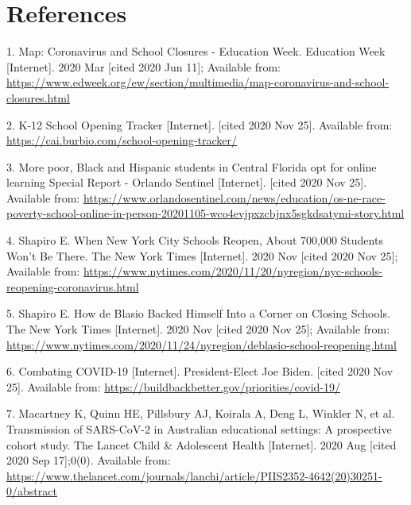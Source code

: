 \documentclass[
]{article}
\begin{document}
\clearpage

\hypertarget{references}{%
\section*{References}\label{references}}

\hypertarget{refs}{}
\leavevmode\hypertarget{ref-noauthor_map_2020}{}%
1. Map: Coronavirus and School Closures - Education Week. Education Week
{[}Internet{]}. 2020 Mar {[}cited 2020 Jun 11{]}; Available from:
\url{https://www.edweek.org/ew/section/multimedia/map-coronavirus-and-school-closures.html}

\leavevmode\hypertarget{ref-noauthor_k-12_nodate}{}%
2. K-12 School Opening Tracker {[}Internet{]}. {[}cited 2020 Nov 25{]}.
Available from: \url{https://cai.burbio.com/school-opening-tracker/}

\leavevmode\hypertarget{ref-noauthor_more_nodate}{}%
3. More poor, Black and Hispanic students in Central Florida opt for
online learning Special Report - Orlando Sentinel {[}Internet{]}.
{[}cited 2020 Nov 25{]}. Available from:
\url{https://www.orlandosentinel.com/news/education/os-ne-race-poverty-school-online-in-person-20201105-wco4evjpxzcbjnx5sgkdsatymi-story.html}

\leavevmode\hypertarget{ref-shapiro_when_2020}{}%
4. Shapiro E. When New York City Schools Reopen, About 700,000 Students
Won't Be There. The New York Times {[}Internet{]}. 2020 Nov {[}cited
2020 Nov 25{]}; Available from:
\url{https://www.nytimes.com/2020/11/20/nyregion/nyc-schools-reopening-coronavirus.html}

\leavevmode\hypertarget{ref-shapiro_how_2020}{}%
5. Shapiro E. How de Blasio Backed Himself Into a Corner on Closing
Schools. The New York Times {[}Internet{]}. 2020 Nov {[}cited 2020 Nov
25{]}; Available from:
\url{https://www.nytimes.com/2020/11/24/nyregion/deblasio-school-reopening.html}

\leavevmode\hypertarget{ref-noauthor_combating_nodate}{}%
6. Combating COVID-19 {[}Internet{]}. President-Elect Joe Biden.
{[}cited 2020 Nov 25{]}. Available from:
\url{https://buildbackbetter.gov/priorities/covid-19/}

\leavevmode\hypertarget{ref-macartney_transmission_2020}{}%
7. Macartney K, Quinn HE, Pillsbury AJ, Koirala A, Deng L, Winkler N, et
al. Transmission of SARS-CoV-2 in Australian educational settings: A
prospective cohort study. The Lancet Child \& Adolescent Health
{[}Internet{]}. 2020 Aug {[}cited 2020 Sep 17{]};0(0). Available from:
\url{https://www.thelancet.com/journals/lanchi/article/PIIS2352-4642(20)30251-0/abstract}
\end{document}

